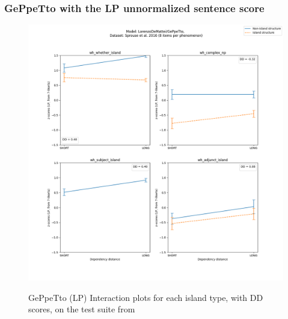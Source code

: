 \subsubsection{GePpeTto with the LP unnormalized sentence score}
\begin{figure}[h]
	\centering
	\includegraphics[width=1\textwidth]{images/AppendixA/Sprouse_wh_LorenzoDeMattei_GePpeTto_LP-zscores-likert-2022-09-14_h17m23s51.png} 
	\label{A-fig:sprouse_gpt_lp}
	\caption{GePpeTto (LP) Interaction plots for each island type, with DD scores, on the test suite from \citet{sprouse2016experimental}}
\end{figure}
\clearpage
